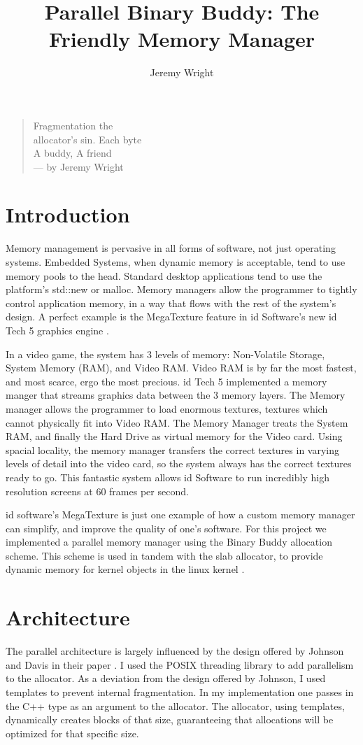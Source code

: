 \documentclass[12pt]{article}
\title{Parallel Binary Buddy: The Friendly Memory Manager}
\author{Jeremy Wright}
\begin{document}
\maketitle

\begin{verse}
Fragmentation the\\
allocator's sin. Each byte\\
A buddy, A friend\\
--- by Jeremy Wright
\end{verse}

\section{Introduction}
Memory management is pervasive in all forms of software, not just operating
systems. Embedded Systems, when dynamic memory is acceptable, tend to use memory
pools to the head.  Standard desktop applications tend
to use the platform's std::new or malloc.  Memory managers allow the programmer 
to tightly control application memory, in a way that flows with the rest of the
system's design.  A perfect example is the MegaTexture feature in id Software's
new id Tech 5 graphics engine \cite{SIGGRAPH2009}.  

In a video game, the system has 3 levels of
memory:  Non-Volatile Storage, System Memory (RAM), and Video RAM.  Video RAM is
by far the most fastest, and most scarce, ergo the most precious.  id Tech
5 implemented a memory manger that streams graphics data between the 3 memory
layers.  The Memory manager allows the programmer to load enormous textures,
textures which cannot physically fit into Video RAM.  The Memory Manager treats
the System RAM, and finally the Hard Drive as virtual memory for the Video card.
Using spacial locality, the memory manager transfers the correct textures in
varying levels of detail into the video card, so the system always has the
correct textures ready to go.  This fantastic system allows id Software to run
incredibly high resolution screens at 60 frames per second.

id software's MegaTexture is just one example of how a custom memory manager can
simplify, and improve the quality of one's software.  For this project we 
implemented a parallel memory manager using the Binary Buddy allocation scheme.  This
 scheme is used in tandem with the slab allocator, to provide dynamic
memory for kernel objects in the linux kernel \cite[p.~134]{kalloc}.

\section{Architecture}
The parallel architecture is largely influenced by the design offered by Johnson
and Davis in their paper \cite{johnson}. I used the POSIX threading library to
add parallelism to the allocator.  As a deviation from the design offered by
Johnson, I used templates to prevent internal fragmentation. In my
implementation one passes in the C++ type as an argument to the allocator.  The
allocator, using templates, dynamically creates blocks of that size,
guaranteeing that allocations will be optimized for that specific size.
\end{document}
